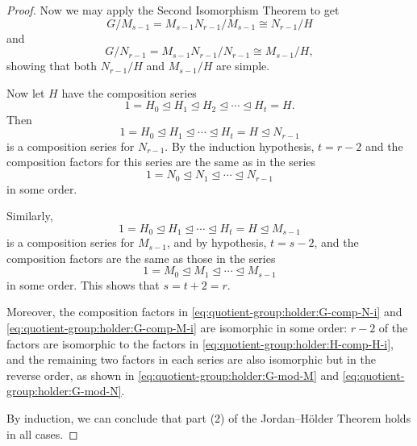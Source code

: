 \begin{proof}
  Now we may apply the Second Isomorphism Theorem to get
  \begin{equation}
    \label{eq:quotient-group:holder:G-mod-M}
    G/M_{s-1} = M_{s-1}N_{r-1}/M_{s-1} \cong N_{r-1}/H
  \end{equation}
  and
  \begin{equation}
    \label{eq:quotient-group:holder:G-mod-N}
    G/N_{r-1} = M_{s-1}N_{r-1}/N_{r-1} \cong M_{s-1}/H,
  \end{equation}
  showing that both $N_{r-1}/H$ and $M_{s-1}/H$ are simple.

  Now let $H$ have the composition series
  \begin{equation}
    \label{eq:quotient-group:holder:H-comp-H-i}
    1 = H_0 \trianglelefteq
    H_1 \trianglelefteq
    H_2 \trianglelefteq\cdots\trianglelefteq
    H_t = H.
  \end{equation}
  Then
  \begin{equation*}
    1 = H_0 \trianglelefteq
    H_1 \trianglelefteq\cdots\trianglelefteq
    H_t = H \trianglelefteq N_{r-1}
  \end{equation*}
  is a composition series for $N_{r-1}$. By the induction hypothesis,
  $t = r - 2$ and the composition factors for this series are the same
  as in the series
  \begin{equation*}
    1 = N_0 \trianglelefteq
    N_1 \trianglelefteq\cdots\trianglelefteq
    N_{r-1}
  \end{equation*}
  in some order.

  Similarly,
  \begin{equation*}
    1 = H_0 \trianglelefteq
    H_1 \trianglelefteq\cdots\trianglelefteq
    H_t = H \trianglelefteq M_{s-1}
  \end{equation*}
  is a composition series for $M_{s-1}$, and by hypothesis,
  $t = s - 2$, and the composition factors are the same as those in
  the series
  \begin{equation*}
    1 = M_0\trianglelefteq
    M_1\trianglelefteq\cdots\trianglelefteq
    M_{s-1}
  \end{equation*}
  in some order. This shows that $s = t+2 = r$.

  Moreover, the composition factors in
  \eqref{eq:quotient-group:holder:G-comp-N-i} and
  \eqref{eq:quotient-group:holder:G-comp-M-i} are isomorphic in some
  order: $r - 2$ of the factors are isomorphic to the factors in
  \eqref{eq:quotient-group:holder:H-comp-H-i}, and the remaining two
  factors in each series are also isomorphic but in the reverse order,
  as shown in \eqref{eq:quotient-group:holder:G-mod-M} and
  \eqref{eq:quotient-group:holder:G-mod-N}.

  By induction, we can conclude that part (2) of the Jordan--H\"older
  Theorem holds in all cases.
\end{proof}

